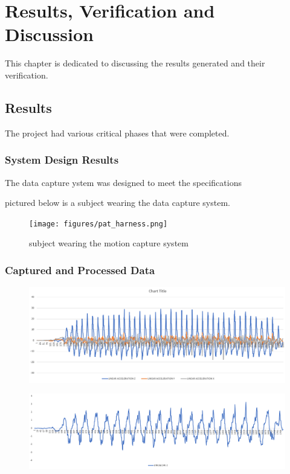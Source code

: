 \chapter{Results, Verification and Discussion}
This chapter is dedicated to discussing the results generated and their verification. 

\section{Results}
The project had various critical phases that were completed.

\subsection{System Design Results}
The data capture ystem was designed to meet the specifications

pictured below is a subject wearing the data capture system.
\begin{figure}[!ht] 
\captionsetup{width=0.5\linewidth, font=small}  
\texttt{[image: figures/pat\_harness.png]}
\caption{subject wearing the motion capture system }
\label{fig:pat_harness}
\end{figure}


\subsection{Captured and Processed Data}

\begin{figure}[!ht] 
\captionsetup{width=\linewidth, font=small}  
\includegraphics[width=\linewidth]{figures/accel.png}
\caption{}
\label{fig:accel}
\end{figure}

\begin{figure}[!ht] 
\captionsetup{width=\linewidth, font=small}  
\includegraphics[width=\linewidth]{figures/gyroz.png}
\caption{}
\label{fig:gyroz}
\end{figure}

